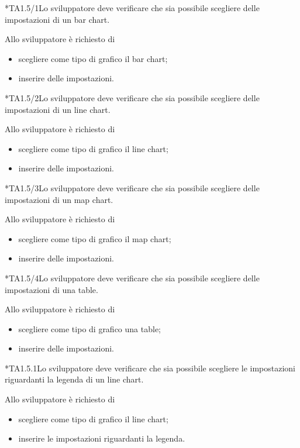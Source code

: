 	*{TA1.5/1}Lo sviluppatore deve verificare che sia possibile scegliere delle impostazioni di un bar chart.

		Allo sviluppatore è richiesto di
		\begin{itemize}
			\item scegliere come tipo di grafico il bar chart;
			\item inserire delle impostazioni.
		\end{itemize}

	*{TA1.5/2}Lo sviluppatore deve verificare che sia possibile scegliere delle impostazioni di un line chart.

		Allo sviluppatore è richiesto di
		\begin{itemize}
			\item scegliere come tipo di grafico il line chart;
			\item inserire delle impostazioni.
		\end{itemize}

	*{TA1.5/3}Lo sviluppatore deve verificare che sia possibile scegliere delle impostazioni di un map chart.

		Allo sviluppatore è richiesto di
		\begin{itemize}
			\item scegliere come tipo di grafico il map chart;
			\item inserire delle impostazioni.
		\end{itemize}

	*{TA1.5/4}Lo sviluppatore deve verificare che sia possibile scegliere delle impostazioni di una table.

		Allo sviluppatore è richiesto di
		\begin{itemize}
			\item scegliere come tipo di grafico una table;
			\item inserire delle impostazioni.
		\end{itemize}

	*{TA1.5.1}Lo sviluppatore deve verificare che sia possibile scegliere le impostazioni riguardanti la legenda di un line chart.

		Allo sviluppatore è richiesto di
		\begin{itemize}
			\item scegliere come tipo di grafico il line chart;
			\item inserire le impostazioni riguardanti la legenda.
		\end{itemize}


